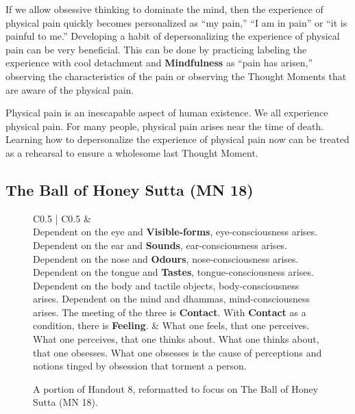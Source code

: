 If we allow obsessive thinking to dominate the mind, then the experience of physical pain quickly becomes personalized as “my pain,” “I am in pain” or “it is painful to me.” Developing a habit of depersonalizing the experience of physical pain can be very beneficial. This can be done by practicing labeling the experience with cool detachment and \textbf{Mindfulness} as “pain has arisen,” observing the characteristics of the pain or observing the Thought Moments that are aware of the physical pain. 

Physical pain is an inescapable aspect of human existence. We all experience physical pain. For many people, physical pain arises near the time of death. Learning how to depersonalize the experience of physical pain now can be treated as a rehearsal to ensure a wholesome last Thought Moment.

\subsection*{The Ball of Honey Sutta (MN 18)}

\begin{figure}[h!]
\begin{tabular*}{\textwidth}{C{0.5\textwidth} | C{0.5\textwidth}}
\toprule
{} &  \\
\midrule
 Dependent on the eye and \textbf{Visible-forms}, eye-consciousness arises.\newline
 Dependent on the ear and \textbf{Sounds}, ear-consciousness arises.\newline
 Dependent on the nose and \textbf{Odours}, nose-consciousness arises.\newline
 Dependent on the tongue and \textbf{Tastes}, tongue-consciousness arises.\newline
 Dependent on the body and tactile objects, body-consciousness arises.\newline
 Dependent on the mind and dhammas, mind-consciousness arises.
  \newline\vspace{5mm}
  The meeting of the three is \textbf{Contact}.
  \newline\vspace{5mm}
  With \textbf{Contact} as a condition, there is \textbf{Feeling}.
  &
  What one feels, that one perceives.\newline
  What one perceives, that one thinks about.\newline
  What one thinks about, that one obsesses.\newline
  What one obsesses is the cause of perceptions and notions tinged by obsession that torment a person.
  \\
  
\bottomrule
\end{tabular*}
\caption{A portion of Handout 8, reformatted to focus on The Ball of Honey Sutta (MN 18).}
\end{figure}

